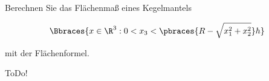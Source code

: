 
\begin{exercise}

Berechnen Sie das Flächenmaß eines Kegelmantels

\begin{align*}
    \Bbraces
    {
        x \in \R^3:
        0 < x_3 < \pbraces{R - \sqrt{x_1^2 + x_2^2}} h
    }
\end{align*}

mit der Flächenformel.

\end{exercise}


\begin{solution}

ToDo!

\end{solution}


